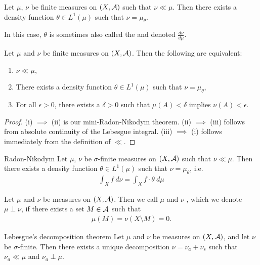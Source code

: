 \begin{theorem}
	 Let $\mu$, $\nu$ be finite measures on $(X, \mathcal{A})$ such that $\nu \ll \mu$. Then there exists a density function $\theta \in L^1(\mu)$ such that $\nu = \mu_\theta$.
\end{theorem}
In this case, $\theta$ is sometimes also called the  and denoted $\frac{d\nu}{d\mu}$.
\begin{theorem}
	Let $\mu$ and $\nu$ be finite measures on $(X, \mathcal{A})$. Then the following are equivalent:
	\begin{enumerate}
		\item $\nu \ll \mu$,
		\item There exists a density function $\theta \in L^1(\mu)$ such that $\nu = \mu_\theta$,
		\item For all $\epsilon > 0$, there exists a $\delta > 0$ such that $\mu(A) < \delta$ implies $\nu(A) < \epsilon$.
	\end{enumerate}
\end{theorem}
\begin{proof}
	(i) $\implies$ (ii) is our mini-Radon-Nikodym theorem. (ii) $\implies$ (iii) follows from absolute continuity of the Lebesgue integral. (iii) $\implies$ (i) follows immediately from the definition of $\ll$.
\end{proof}
\begin{importanttheorem}
	{Radon-Nikodym}{} Let $\mu$, $\nu$ be $\sigma$-finite measures on $(X, \mathcal{A})$ such that $\nu \ll \mu$. Then there exists a density function $\theta \in L^1(\mu)$ such that $\nu = \mu_\theta$, i.e.
	\begin{align*}
		\int_X f ~d\nu = \int_X f \cdot \theta ~d\mu
	\end{align*}
\end{importanttheorem}
\begin{importantdefinition}{}{}
	Let $\mu$ and $\nu$ be measures on $(X, \mathcal{A})$. Then we call $\mu$ and $\nu$ , which we denote $\mu \perp \nu$, if there exists a set $M \in \mathcal{A}$ such that
	\begin{align*}
		\mu(M) = \nu(X \setminus M) = 0.
	\end{align*}
\end{importantdefinition}
\begin{importanttheorem}
	{Lebesgue's decomposition theorem}{} Let $\mu$ and $\nu$ be measures on $(X, \mathcal{A})$, and let $\nu$ be $\sigma$-finite. Then there exists a unique decomposition $\nu = \nu_a + \nu_s$ such that $\nu_a \ll \mu$ and $\nu_a \perp \mu$.
\end{importanttheorem}
